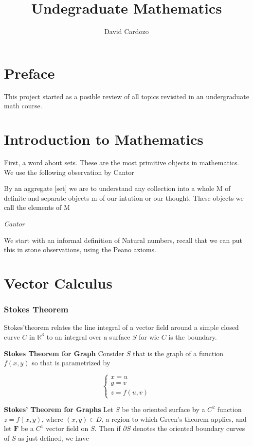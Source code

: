 \documentclass[11pt,twoside]{book}
\title{Undegraduate Mathematics}
\author{David Cardozo}
\newcommand{\RR}{\mathbb{R}}
\begin{document}
\maketitle
\chapter{Preface}
This project started as a posible review of all topics revisited in an undergraduate math course.

\mainmatter
\chapter{Introduction to Mathematics}
First, a word about sets. These are the most primitive objects in mathematics. We use the following observation by Cantor

\epigraph{By an aggregate [set] we are to understand any collection into a whole M of definite and separate objects m of our intution or our thought. These objects we call the elements of M}{\textit{Cantor}}

We start with an informal definition of Natural numbers, recall that we can put this in stone observations, using the Peano axioms.

\chapter{Vector Calculus}

\subsection{Stokes Theorem}
Stokes'theorem relates the line integral of a vector field around a simple closed curve $C$ in $\RR^3$ to an integral over a surface $S$ for wic $C$ is the boundary.

\textbf{Stokes Theorem for Graph}
Consider $S$ that is the graph of a function $f(x,y)$ so that is parametrized by

\[
\begin{cases}
	x = u \\
	y = v \\
	z = f(u,v)
\end{cases}
\]

\textbf{Stokes' Theorem for Graphs} Let $S$ be the oriented surface by a $C^2$ function $z = f(x,y)$, where $(x,y) \in D$, a region to which Green's theorem applies, and let $\textbf{F}$ be a $C^1$ vector field on $S$. Then if $\partial S$ denotes the oriented boundary curves of $S$ as just defined, we have
\end{document}
